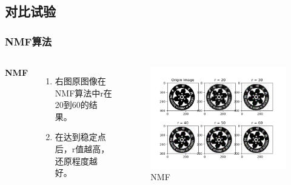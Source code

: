 \documentclass[UTF8,mathserif]{beamer}
\begin{document}

\subsection{对比试验}


\begin{frame}
\frametitle{NMF算法}

\begin{columns}[c] %
	
	\textbf{NMF}
	\begin{enumerate}
		\item 右图原图像在NMF算法中r在20到60的结果。
		\item 在达到稳定点后，r值越高，还原程度越好。
	\end{enumerate}
	
	\begin{figure}[h]%
		\centering  %
		\includegraphics[width=1.2\linewidth]{image/Analyse_NMF}  %
		\caption{NMF}  %
		\label{fig:mcmthesis-logo}   %
	\end{figure}
	
	
\end{columns}
\end{frame}
\end{document}
